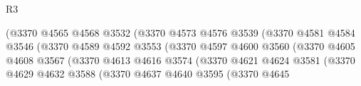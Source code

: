 \begin{lexlean}{R3}
\begin{coremodule}
                                              (@3370
                                                @4565
                                                @4568
                                                @3532
                                                (@3370
                                                  @4573
                                                  @4576
                                                  @3539
                                                  (@3370
                                                    @4581
                                                    @4584
                                                    @3546
                                                    (@3370
                                                      @4589
                                                      @4592
                                                      @3553
                                                      (@3370
                                                        @4597
                                                        @4600
                                                        @3560
                                                        (@3370
                                                          @4605
                                                          @4608
                                                          @3567
                                                          (@3370
                                                            @4613
                                                            @4616
                                                            @3574
                                                            (@3370
                                                              @4621
                                                              @4624
                                                              @3581
                                                              (@3370
                                                                @4629
                                                                @4632
                                                                @3588
                                                                (@3370
                                                                  @4637
                                                                  @4640
                                                                  @3595
                                                                  (@3370
                                                                    @4645

\end{coremodule}
\end{lexlean}
